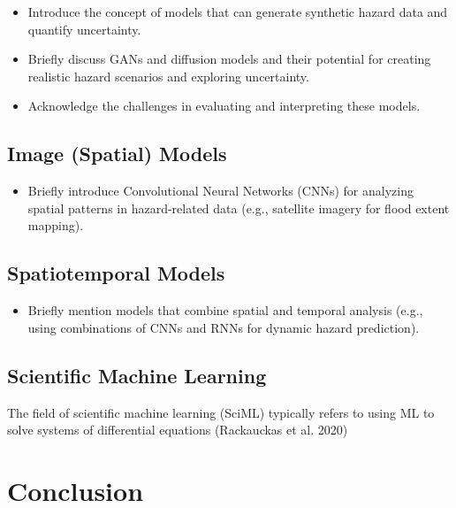 \documentclass[
  letterpaper,
  DIV=11,
  numbers=noendperiod]{scrreprt}
\providecommand{\tightlist}{%
  \setlength{\itemsep}{0pt}\setlength{\parskip}{0pt}}
\begin{document}
\begin{itemize}
\tightlist
\item
  Introduce the concept of models that can generate synthetic hazard
  data and quantify uncertainty.
\item
  Briefly discuss GANs and diffusion models and their potential for
  creating realistic hazard scenarios and exploring uncertainty.
\item
  Acknowledge the challenges in evaluating and interpreting these
  models.
\end{itemize}

\subsection{Image (Spatial) Models}\label{image-spatial-models}

\begin{itemize}
\tightlist
\item
  Briefly introduce Convolutional Neural Networks (CNNs) for analyzing
  spatial patterns in hazard-related data (e.g., satellite imagery for
  flood extent mapping).
\end{itemize}

\subsection{Spatiotemporal Models}\label{spatiotemporal-models}

\begin{itemize}
\tightlist
\item
  Briefly mention models that combine spatial and temporal analysis
  (e.g., using combinations of CNNs and RNNs for dynamic hazard
  prediction).
\end{itemize}

\subsection{Scientific Machine
Learning}\label{scientific-machine-learning}

The field of scientific machine learning (SciML) typically refers to
using ML to solve systems of differential equations (Rackauckas et al.
2020)

\section*{Conclusion}\label{conclusion}
\end{document}
